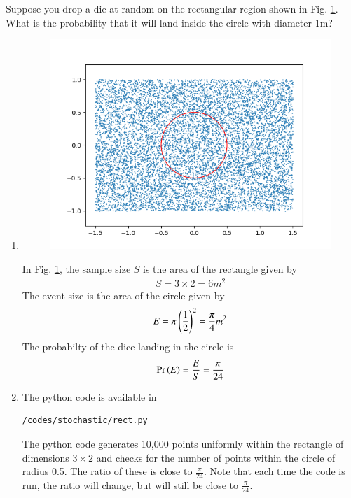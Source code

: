 Suppose you drop a die at random on the rectangular region shown in Fig. \ref{fig:chapters/uniform/1/}. What is the probability that it will land inside the circle with diameter 1m?
\renewcommand{\theequation}{\theenumi}
\renewcommand{\thefigure}{\theenumi}
\begin{enumerate}[label=\thesection.\arabic*.,ref=\thesection.\theenumi]
%
\item 
\begin{figure}[!ht]
\centering
\includegraphics[width=\columnwidth]{./figs/stochastic/rectangle.png}
\caption{}
\label{fig:chapters/uniform/1/}
\end{figure}
In Fig. \ref{fig:chapters/uniform/1/}, the sample size $S$ is the area of the rectangle given by 
\begin{align}
S=3\times 2=6 m^2
\end{align}
The event size is the area of the circle given by 
\begin{align}
E = \pi\left(\frac{1}{2}\right)^2=\frac{\pi}{4} m^2 
\end{align}
The probabilty of the dice landing in the circle is
\begin{align}
\Pr\left(E\right) = \frac{E}{S} = \frac{\pi}{24}
\label{eq:chapters/uniform/1/prob}
\end{align}
%
\item The python code is available in 
\begin{lstlisting}
/codes/stochastic/rect.py
\end{lstlisting}
The python code generates 10,000 points uniformly within the rectangle of dimensions $3 \times 2$ and checks for the number of points within the circle of radius 0.5.  The ratio of these is close to $\frac{\pi}{24}$.  Note that each time the code is run, the ratio will change, but will still be close to $\frac{\pi}{24}$.



\end{enumerate}
